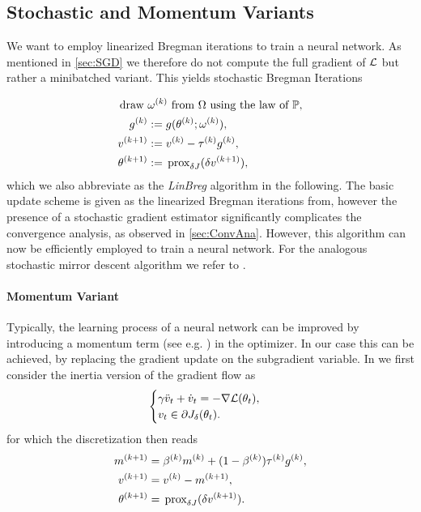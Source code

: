 \subsection{Stochastic and Momentum Variants}\label{sec:Bregmom}
%
%
We want to employ linearized Bregman iterations to train a neural network. As mentioned in \cref{sec:SGD} we therefore do not compute the full gradient of $\mathcal{L}$ but rather a minibatched variant. This yields stochastic Bregman Iterations
%

\begin{align}\label{eq:stochlinbreg}
\begin{split}
\text{draw }&\omega^{(k)}\text{ from }\Omega\text{ using the law of }\mathbb{P},\\
g^{(k)} &:= {g(\theta^{(k)};\omega^{(k)})},\\
v^{(k+1)} &:= v^{(k)} - \tau^{(k)} g^{(k)},\\
\theta^{(k+1)} &:= \,\mathrm{prox}_{\delta J}(\delta v^{(k+1)}),
\end{split}
\end{align}
%
which we also abbreviate as the \emph{LinBreg} algorithm in the following.
%
The basic update scheme is given as the linearized Bregman iterations from\cite{osher2005iterative}, however the presence of a stochastic gradient estimator significantly complicates the convergence analysis, as observed in \cref{sec:ConvAna}. However, this algorithm can now be efficiently employed to train a neural network. For the analogous stochastic mirror descent algorithm we refer to \cite{nemirovski2009robust}.
%
\paragraph{Momentum Variant} Typically, the learning process of a neural network can be improved by introducing a momentum term (see e.g. \cite{nesterov1983method, qian1999momentum}) in the optimizer. In our case this can be achieved, by replacing the gradient update on the subgradient variable. In \cite{bungert2022bregman} we first consider the inertia version of the gradient flow as
%
\begin{align*}
\begin{cases}
    \gamma \ddot{v}_t + \dot{v}_t = -\nabla\mathcal{L}(\theta_t), \\
    v_t \in \partial J_\delta(\theta_t).
\end{cases}
\end{align*}
%
for which the discretization then reads
%
\begin{align}\label{eq:momBreg}
\begin{split}
m^{(k+1)} &= \beta^{(k)} m^{(k)} + (1-\beta^{(k)})\tau^{(k)} g^{(k)},\\
v^{(k+1)} &= v^{(k)} - m^{(k+1)},\\
\theta^{(k+1)} &= \,\mathrm{prox}_{\delta J}(\delta v^{(k+1)}).
\end{split}
\end{align}
%
%
